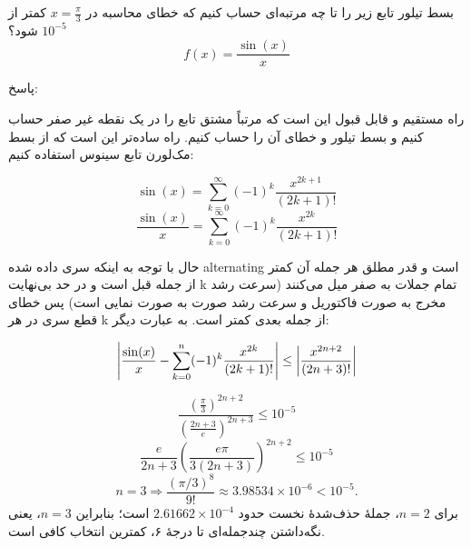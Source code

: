 بسط تیلور تابع زیر را تا چه مرتبه‌ای حساب کنیم که خطای محاسبه در $x= \frac{\pi}{3}$ کمتر از $10^{-5}$ شود؟
$$f(x) = \frac{\sin(x)}{x}$$

پاسخ:

راه مستقیم و قابل قبول این است که مرتباً مشتق تابع را در یک نقطه غیر صفر حساب کنیم و بسط تیلور و خطای آن را حساب کنیم.
راه ساده‌تر این است که از بسط مک‌لورن تابع سینوس استفاده کنیم:

$$\sin(x) = \sum_{k=0}^{\infty} (-1)^k \frac{x^{2k+1}}{(2k+1)!}$$
$$\frac{\sin(x)}{x} = \sum_{k=0}^{\infty} (-1)^k \frac{x^{2k}}{(2k+1)!}$$

حال با توجه به اینکه سری داده شده alternating است و قدر مطلق هر جمله آن کمتر از جمله قبل است و در حد بی‌نهایت k تمام جملات به صفر میل می‌کنند (سرعت رشد مخرج به صورت فاکتوریل و سرعت رشد صورت به صورت نمایی است) پس خطای قطع سری در هر k از جمله بعدی کمتر است. به عبارت دیگر:

$$\abs{\frac{\sin(x)}{x} - \sum_{k=0}^{n} (-1)^k \frac{x^{2k}}{(2k+1)!}} \leq \abs{\frac{x^{2n+2}}{(2n+3)!}}$$

$$\frac{(\frac{\pi}{3})^{2n+2}}{(\frac{2n+3}{e})^{2n+3}} \leq 10^{-5}$$
$$\frac{e}{2n+3} (\frac{e\pi}{3(2n+3)})^{2n+2} \leq 10^{-5}$$
$$n=3 \Rightarrow \frac{(\pi/3)^8}{9!}\approx3.98534\times10^{-6}<10^{-5}.$$
برای \(n=2\)، جملهٔ حذف‌شدهٔ نخست حدود
\(2.61662\times10^{-4}\)
است؛ بنابراین \(n=3\)، یعنی نگه‌داشتن چندجمله‌ای تا درجهٔ ۶، کمترین انتخاب کافی است.
